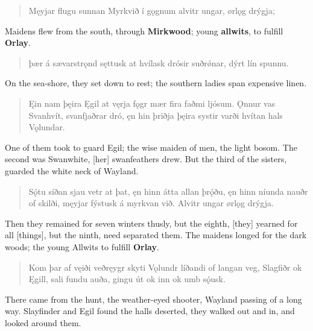 \begin{verse}
\bva Męyjar flugu sunnan \hld Myrkvið í gǫgnum
alvitr ungar, \hld ørlǫg drýgja; \\%
\end{verse}

\bvb Maidens flew from the south, through \textbf{Mirkwood}; young \textbf{allwits}, to fulfill \textbf{Orlay}. \\

\begin{verse}
\bva þær á sævarstrǫnd \hld sęttusk at hvílask
drósir suðrǿnar, \hld dýrt lín spunnu. \\%
\end{verse}

\bvb On the sea-shore, they set down to rest; the southern ladies span expensive linen. \\

\begin{verse}
\bva Ęin nam þęira \hld Ęgil at vęrja
fǫgr mær fira \hld faðmi ljósum.
Ǫnnur vas Svanhvít, \hld svanfjaðrar dró,
ęn hin þriðja \hld þęira systir
varði hvítan \hld hals Vǫlundar. \\%
\end{verse}

\bvb One of them took to guard Egil; the wise maiden of men, the light bosom. The second was Swanwhite, [her] swanfeathers drew. But the third of the sisters, guarded the white neck of Wayland. \\

\begin{verse}
\bva Sǫ́tu síðan \hld sjau vetr at þat,
ęn hinn átta \hld allan þrǫ́ðu,
ęn hinn níunda \hld nauðr of skilði,
męyjar fýstusk \hld á myrkvan við.
Alvitr ungar \hld ørlǫg drýgja. \\%
\end{verse}

\bvb Then they remained for seven winters thusly, but the eighth, [they] yearned for all [things], but the ninth, need separated them. The maidens longed for the dark woods; the young Allwits to fulfill \textbf{Orlay}. \\

\begin{verse}
\bva Kom þar af vęiði \hld veðręygr skyti
Vǫlundr líðandi \hld of langan veg,
Slagfiðr ok Ęgill, \hld sali fundu auða,
gingu út ok inn \hld ok umb sǫ́usk. \\%
\end{verse}

\bvb There came from the hunt, the weather-eyed shooter, Wayland passing of a long way. Slayfinder and Egil found the halls deserted, they walked out and in, and looked around them. \\

